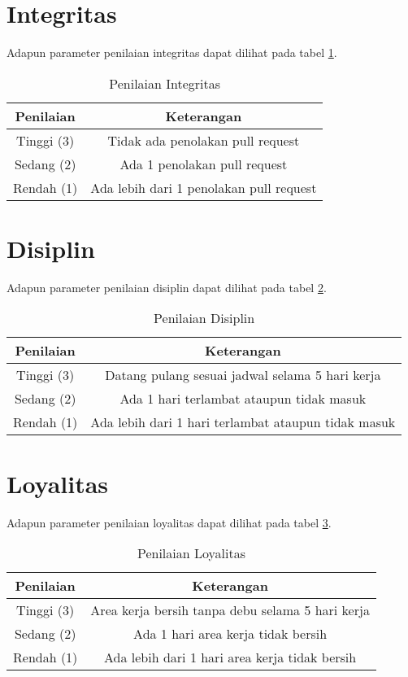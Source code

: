 \section{Integritas}

Adapun parameter penilaian integritas dapat dilihat pada tabel \ref{tab:nilaiintegritas}.

\begin{table}[h]
\caption{Penilaian Integritas}
\centering
\begin{tabular}{|c|c|}
\hline
Penilaian&Keterangan\\
\hline
Tinggi (3)&Tidak ada penolakan pull request\\
\hline
Sedang (2)&Ada 1 penolakan pull request\\
\hline
Rendah (1)&Ada lebih dari 1 penolakan pull request\\
\hline
\end{tabular}
\label{tab:nilaiintegritas}
\end{table}

\section{Disiplin}

Adapun parameter penilaian disiplin dapat dilihat pada tabel \ref{tab:nilaidisiplin}.

\begin{table}[h]
\caption{Penilaian Disiplin}
\centering
\begin{tabular}{|c|c|}
\hline
Penilaian&Keterangan\\
\hline
Tinggi (3)&Datang pulang sesuai jadwal selama 5 hari kerja\\
\hline
Sedang (2)&Ada 1 hari terlambat ataupun tidak masuk\\
\hline
Rendah (1)&Ada lebih dari 1 hari terlambat ataupun tidak masuk\\
\hline
\end{tabular}
\label{tab:nilaidisiplin}
\end{table}

\section{Loyalitas}

Adapun parameter penilaian loyalitas dapat dilihat pada tabel \ref{tab:nilailoyalitas}.

\begin{table}[h]
\caption{Penilaian Loyalitas}
\centering
\begin{tabular}{|c|c|}
\hline
Penilaian&Keterangan\\
\hline
Tinggi (3)&Area kerja bersih tanpa debu selama 5 hari kerja\\
\hline
Sedang (2)&Ada 1 hari area kerja tidak bersih\\
\hline
Rendah (1)&Ada lebih dari 1 hari area kerja tidak bersih\\
\hline
\end{tabular}
\label{tab:nilailoyalitas}
\end{table}

